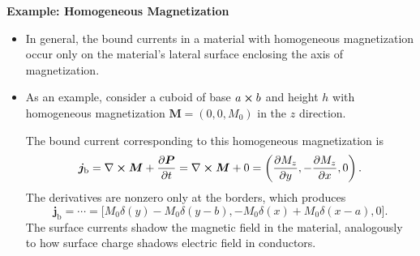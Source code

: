 \documentclass[11pt, a4paper]{article}
\renewcommand{\vec}[1]{\bm{#1}} %
\renewcommand{\P}{\vec{P}}  %
\newcommand{\M}{\vec{M}}  %
\renewcommand{\j}{\vec{j}}  %
\renewcommand{\curl}{\nabla \cross}
\begin{document}
\textbf{Example: Homogeneous Magnetization}
\begin{itemize}
	\item  In general, the bound currents in a material with homogeneous magnetization occur only on the material's lateral surface enclosing the axis of magnetization. 

	\item As an example, consider a cuboid of base $ a \cross b $ and height $ h $ with homogeneous magnetization $ \M = (0, 0, M_{0}) $ in the $ z $ direction. 

    The bound current corresponding to this homogeneous magnetization is
	\begin{equation*}
		\j_{\text{b}} = \curl \M + \pdv{\P}{t} = \curl \M + 0 = \left(\pdv{M_{z}}{y}, - \pdv{M_{z}}{x}, 0\right).
	\end{equation*}
	The derivatives are nonzero only at the borders, which produces
	\begin{equation*}
		\j_{\text{b}} = \cdots = \big[M_{0}\delta(y) - M_{0}\delta(y-b), -M_{0}\delta(x) + M_{0}\delta(x - a), 0\big].
	\end{equation*}
	The surface currents shadow the magnetic field in the material, analogously to how surface charge shadows electric field in conductors.

\end{itemize}
\end{document}
